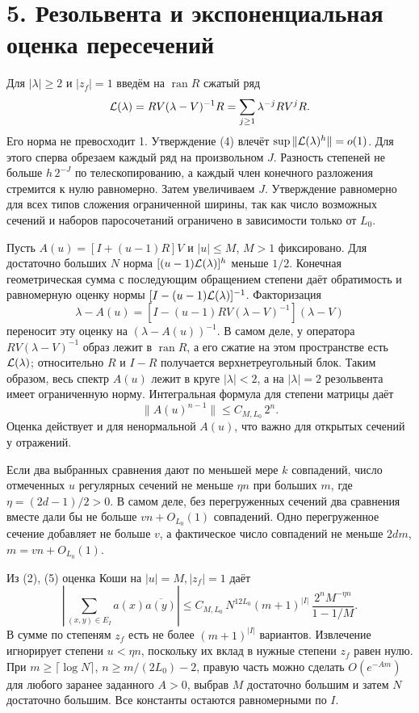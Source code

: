 \documentclass[11pt,a4paper]{article}
\newcommand{\sect}[1]{\section*{\sffamily\color{ink}#1}}
\begin{document}
\newpage
\sect{5. Резольвента и экспоненциальная оценка пересечений}
Для \(|\lambda|\ge2\) и \(|z_f|=1\) введём на \(\operatorname{ran}R\) сжатый ряд
\[
      {\cal L}(\lambda)
        =R V(\lambda-V)^{-1} R
        =\sum_{j\ge1}\lambda^{-j} R V^j R .
\]
Его норма не превосходит 1. Утверждение (4) влечёт
\(\sup\|{\cal L}(\lambda)^h\|=o(1)\). Для этого сперва обрезаем каждый ряд на произвольном \(J\). Разность степеней не больше \(h\,2^{-J}\) по телескопированию, а каждый член конечного разложения стремится к нулю равномерно. Затем увеличиваем \(J\). Утверждение равномерно для всех типов сложения ограниченной ширины, так как число возможных сечений и наборов паросочетаний ограничено в зависимости только от \(L_0\).

Пусть \(A(u)=[I+(u-1)R]V\) и \(|u|\le M\), \(M>1\) фиксировано.
Для достаточно больших \(N\) норма \([(u-1){\cal L}(\lambda)]^h\) меньше \(1/2\). Конечная геометрическая сумма с последующим обращением степени даёт обратимость и равномерную оценку нормы
\([I-(u-1){\cal L}(\lambda)]^{-1}\).
Факторизация
\[
 \lambda-A(u)=
       [I-(u-1)R V(\lambda-V)^{-1}](\lambda-V)
\]
переносит эту оценку на \((\lambda-A(u))^{-1}\). В самом деле, у оператора
\(R V(\lambda-V)^{-1}\) образ лежит в \(\operatorname{ran}R\), а его сжатие на этом пространстве есть \({\cal L}(\lambda)\); относительно \(R\) и \(I-R\) получается верхнетреугольный блок. Таким образом, весь спектр \(A(u)\) лежит в круге \(|\lambda|<2\), а на \(|\lambda|=2\) резольвента имеет ограниченную норму. Интегральная формула для степени матрицы даёт
\[
                         \|A(u)^{n-1}\|\le C_{M,L_0}\,2^n.     \tag{5}
\]
Оценка действует и для ненормальной \(A(u)\), что важно для открытых сечений у отражений.

Если два выбранных сравнения дают по меньшей мере \(k\) совпадений, число отмеченных \(u\) регулярных сечений не меньше \(\eta n\) при больших \(m\), где \(\eta=(2d-1)/2>0\). В самом деле, без перегруженных сечений два сравнения вместе дали бы не больше \(vn+O_{L_0}(1)\) совпадений. Одно перегруженное сечение добавляет не больше \(v\), а фактическое число совпадений не меньше \(2dm\), \(m=vn+O_{L_0}(1)\).

Из (2), (5) оценка Коши на \(|u|=M, |z_f|=1\) даёт
\[
 \left|\sum_{(x,y)\in E_I}a(x)\overline{a(y)}\right|
 \le C_{M,L_0}\,N^{12L_0}(m+1)^{|I|}\,
                \frac{2^n M^{-\eta n}}{1-1/M}.               \tag{6}
\]
В сумме по степеням \(z_f\) есть не более \((m+1)^{|I|}\) вариантов. Извлечение игнорирует степени \(u<\eta n\), поскольку их вклад в нужные степени \(z_f\) равен нулю. При \(m\ge\lceil\log N\rceil\), \(n\ge m/(2L_0)-2\), правую часть можно сделать \(O(e^{-Am})\) для любого заранее заданного \(A>0\), выбрав \(M\) достаточно большим и затем \(N\) достаточно большим. Все константы остаются равномерными по \(I\).
\end{document}
